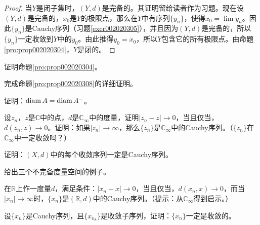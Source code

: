 \begin{proof}
当$Y$是闭子集时，$(Y, d)$是完备的。其证明留给读者作为习题。现在设$(Y, d)$是完备的，$x_0$是$Y$的极限点，那么在$Y$中有序列$\{y_n\}$，使得$x_0 = \lim{y_n}$。因此$\{y_n\}$是Cauchy序列（习题\ref{exer002020305}），并且因为$(Y, d)$是完备的，所以$\{y_n\}$一定收敛到$Y$中的$y_0$。由此推得$y_0 = x_0$，所以$Y$包含它的所有极限点。由命题\ref{pro:prop002020304}，$Y$是闭的。
\end{proof}

\begin{exercise}
证明命题\ref{pro:prop002020304}。
\end{exercise}

\begin{exercise}
完成命题\ref{pro:prop002020308}的详细证明。
\end{exercise}

\begin{exercise}\label{exer002020303}
证明：$\operatorname{diam}{A} = \operatorname{diam}{A^-}$。
\end{exercise}

\begin{exercise}\label{exer002020304}
设$z_n$，$z$是$\mathbb{C}$中的点，$d$是$\mathbb{C}_{\infty}$中的度量，证明$|z_n - z| \to 0$，当且仅当，$d(z_n, z) \to 0$。证明：如果$|z_n| \to \infty$，那么$\{z_n\}$是$\mathbb{C}_{\infty}$中的Cauchy序列。（$\{z_n\}$在$\mathbb{C}_{\infty}$中一定收敛吗？）
\end{exercise}

\begin{exercise}\label{exer002020305}
证明：$(X, d)$中的每个收敛序列一定是Cauchy序列。
\end{exercise}

\begin{exercise}\label{exer002020306}
给出三个不完备度量空间的例子。
\end{exercise}

\begin{exercise}\label{exer002020307}
在$\mathbb{R}$上作一度量$d$，满足条件：$|x_n - x| \to 0$，当且仅当，$d(x_n, x) \to 0$，而当$|x_n| \to \infty$时，$\{x_n\}$是$(\mathbb{R}, d)$中的Cauchy序列。（提示：从$\mathbb{C}_{\infty}$得到启示。）
\end{exercise}

\begin{exercise}\label{exer002020308}
设$\{x_n\}$是Cauchy序列，且$\{x_{n_k}\}$是收敛子序列，证明：$\{x_n\}$一定是收敛的。
\end{exercise}



